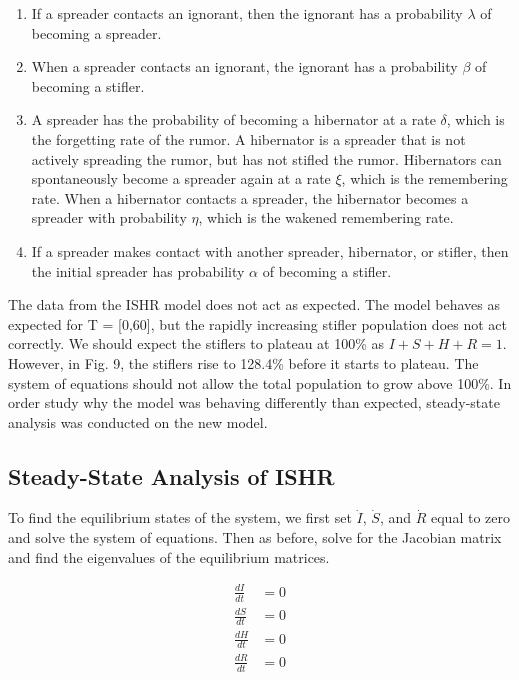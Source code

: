 \documentclass[11pt]{article}
\begin{document}
\begin{enumerate}
\item If a spreader contacts an ignorant, then the ignorant has a probability $\lambda$ of becoming a spreader.
\item When a spreader contacts an ignorant, the ignorant has a probability $\beta$ of becoming a stifler.
\item A spreader has the probability of becoming a hibernator at a rate $\delta$, which is the forgetting rate of the rumor. A hibernator is a spreader that is not actively spreading the rumor, but has not stifled the rumor. Hibernators can spontaneously become a spreader again at a rate $\xi$, which is the remembering rate. When a hibernator contacts a spreader, the hibernator becomes a spreader with probability $\eta$, which is the wakened remembering rate.
\item If a spreader makes contact with another spreader, hibernator, or stifler, then the initial spreader has probability $\alpha$ of becoming a stifler.
\end{enumerate}

The data from the ISHR model does not act as expected. The model behaves as expected for T = [0,60], but the rapidly increasing stifler population does not act correctly. We should expect the stiflers to plateau at 100\% as $I + S + H + R = 1$. However, in Fig. 9, the stiflers rise to 128.4\% before it starts to plateau. The system of equations should not allow the total population to grow above 100\%. In order study why the model was behaving differently than expected, steady-state analysis was conducted on the new model. 

\subsection{Steady-State Analysis of ISHR}
To find the equilibrium states of the system, we first set $\dot{I}$, $\dot{S}$, and $\dot{R}$ equal to zero and solve the system of equations. Then as before, solve for the Jacobian matrix and find the eigenvalues of the equilibrium matrices. 

	\begin{align*}
    \frac{dI}{dt} &= 0 \\
    \frac{dS}{dt} &= 0 \\
    \frac{dH}{dt} &= 0 \\
    \frac{dR}{dt} &= 0
    \end{align*}
    
\end{document}
